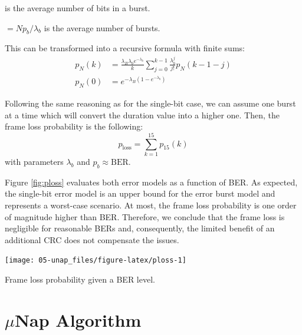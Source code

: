 \documentclass[twoside,nohyper]{tufte-book}
\providecommand{\tightlist}{%
  \setlength{\itemsep}{0pt}\setlength{\parskip}{0pt}}
\theoremstyle{definition}
\theoremstyle{definition}
\theoremstyle{definition}
\theoremstyle{remark}
\begin{document}
\begin{description}
\tightlist
\item[\(\lambda_b\)]
is the average number of bits in a burst.
\item[\(\lambda_B\)]
\(= Np_b/\lambda_b\) is the average number of bursts.
\end{description}

This can be transformed into a recursive formula with finite sums:
%
\begin{equation}
\begin{split}
 p_N(k) &= \frac{\lambda_B\lambda_b e^{-\lambda_b}}{k}\sum_{j=0}^{k-1} \frac{\lambda_b^j}{j!}p_N(k-1-j) \\
 p_N(0) &= e^{-\lambda_B\left(1-e^{-\lambda_b}\right)} 
\end{split}
\label{eq:pN0}
\end{equation}
%

Following the same reasoning as for the single-bit case, we can assume
one burst at a time which will convert the duration value into a higher
one. Then, the frame loss probability is the following:
%
\begin{equation}
 p_{\mathrm{loss}} = \sum_{k=1}^{15} p_{15}(k)
 \label{eq:plossburst}
\end{equation}
%
with parameters \(\lambda_b\) and \(p_b \approx \mathrm{BER}\).

Figure \ref{fig:ploss} evaluates both error models as a function of BER.
As expected, the single-bit error model is an upper bound for the error
burst model and represents a worst-case scenario. At most, the frame
loss probability is one order of magnitude higher than BER. Therefore,
we conclude that the frame loss is negligible for reasonable BERs and,
consequently, the limited benefit of an additional CRC does not
compensate the issues.



\begin{marginfigure}

{\centering \texttt{[image: 05-unap\_files/figure-latex/ploss-1]} 

}

\caption[Frame loss probability given a BER level.]{Frame loss probability given a BER level.}\label{fig:ploss}
\end{marginfigure}

\section{\texorpdfstring{$\mu$}{\textmu}Nap Algorithm}\label{munap-algorithm}
\end{document}

